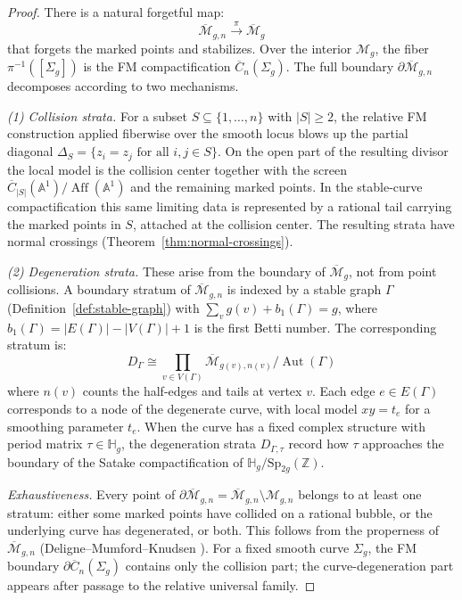 \begin{proof}
There is a natural forgetful map:
\[
\overline{\mathcal{M}}_{g,n} \xrightarrow{\;\pi\;} \overline{\mathcal{M}}_g
\]
that forgets the marked points and stabilizes. Over the interior $\mathcal{M}_g$, the fiber $\pi^{-1}([\Sigma_g])$ is the FM compactification $\overline{C}_n(\Sigma_g)$. The full boundary $\partial\overline{\mathcal{M}}_{g,n}$ decomposes according to two mechanisms.

\emph{(1) Collision strata.}
For a subset $S \subseteq \{1, \ldots, n\}$ with $|S| \geq 2$, the
relative FM construction applied fiberwise over the smooth locus blows
up the partial diagonal
$\Delta_S=\{z_i=z_j\text{ for all }i,j\in S\}$. On the open part of
the resulting divisor the local model is the collision center together
with the screen
$\overline C_{|S|}(\mathbb{A}^1)/\operatorname{Aff}(\mathbb{A}^1)$ and
the remaining marked points. In the stable-curve compactification this
same limiting data is represented by a rational tail carrying the
marked points in $S$, attached at the collision center. The resulting
strata have normal crossings (Theorem~\ref{thm:normal-crossings}).

\emph{(2) Degeneration strata.}
These arise from the boundary of $\overline{\mathcal{M}}_g$, not from point collisions. A boundary stratum of $\overline{\mathcal{M}}_{g,n}$ is indexed by a stable graph $\Gamma$ (Definition~\ref{def:stable-graph}) with $\sum_{v} g(v) + b_1(\Gamma) = g$, where $b_1(\Gamma) = |E(\Gamma)| - |V(\Gamma)| + 1$ is the first Betti number. The corresponding stratum is:
\[
D_\Gamma \cong \prod_{v \in V(\Gamma)} \overline{\mathcal{M}}_{g(v), n(v)} \bigg/ \operatorname{Aut}(\Gamma)
\]
where $n(v)$ counts the half-edges and tails at vertex $v$. Each edge $e \in E(\Gamma)$ corresponds to a node of the degenerate curve, with local model $xy = t_e$ for a smoothing parameter $t_e$. When the curve has a fixed complex structure with period matrix $\tau \in \mathbb{H}_g$, the degeneration strata $D_{\Gamma,\tau}$ record how $\tau$ approaches the boundary of the Satake compactification of $\mathbb{H}_g / \mathrm{Sp}_{2g}(\mathbb{Z})$.

\emph{Exhaustiveness.}
Every point of
$\partial\overline{\mathcal{M}}_{g,n}
= \overline{\mathcal{M}}_{g,n}\setminus \mathcal{M}_{g,n}$
belongs to at least one stratum: either some marked points have
collided on a rational bubble, or the underlying curve has degenerated,
or both. This follows from the properness of
$\overline{\mathcal{M}}_{g,n}$ (Deligne--Mumford--Knudsen
\cite{DeligneM69,Knudsen83}). For a fixed smooth curve
$\Sigma_g$, the FM boundary
$\partial\overline{C}_n(\Sigma_g)$ contains only the collision part;
the curve-degeneration part appears after passage to the relative
universal family.
\end{proof}

